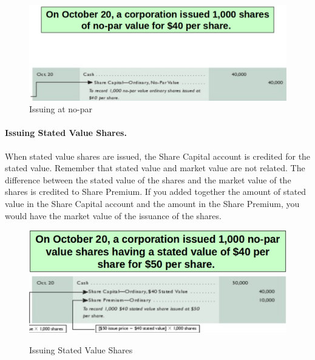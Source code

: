 \documentclass[../main.tex]{subfiles}
\begin{document}
	\begin{figure}[ht]
		\centering
		\includegraphics[width=\columnwidth]{images/c9/issuing_no_par_eg.png}
		\caption{Issuing at no-par}
	\end{figure}
	
	\paragraph{Issuing Stated Value Shares.} When stated value shares are 
	issued, the Share Capital account is credited for the stated value.  
	Remember that stated value and market value are not related.  The 
	difference between the stated value of the shares and the market value of 
	the shares is credited to Share Premium. If you added together the amount 
	of stated value in the Share Capital account and the amount in the Share 
	Premium, you would have the market value of the issuance of the shares. 
	
	\begin{figure}[ht!]
		\centering
		\includegraphics[width=\columnwidth]{images/c9/stated_eg1.png}
		\includegraphics[width=\columnwidth]{images/c9/stated_eg2.png}
		\caption{Issuing Stated Value Shares}
	\end{figure}
	
\end{document}
